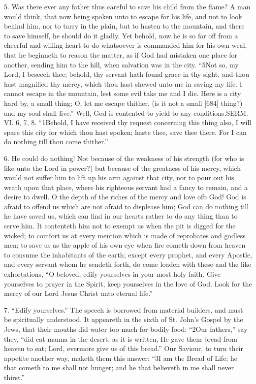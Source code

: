 5. Was there ever any father thus careful to save his child from the flame? A man would think, that now being spoken unto to escape for his life, and not to look behind him, nor to tarry in the plain, but to hasten to the mountain, and there to save himself, he should do it gladly. Yet behold, now he is so far off from a cheerful and willing heart to do whatsoever is commanded him for his own weal, that he beginneth to reason the matter, as if God had mistaken one place for another, sending him to the hill, when salvation was in the city. “5Not so, my Lord, I beseeeh thee; behold, thy servant hath found grace in thy sight, and thou hast magnified thy mercy, which thou hast shewed unto me in saving my life. I cannot escape in the mountain, lest some evil take me and I die. Here is a city hard by, a small thing; O, let me escape thither, (is it not a small [684] thing?) and my soul shall live.” Well, God is contented to yield to any conditions.SERM. VI. 6, 7, 8. “1Behold, I have received thy request concerning this thing also, I will spare this city for which thou hast spoken; haste thee, save thee there. For I can do nothing till thou come thither.”

6. He could do nothing! Not because of the weakness of his strength (for who is like unto the Lord in power?) but because of the greatness of his mercy, which would not suffer him to lift up his arm against that city, nor to pour out his wrath upon that place, where his righteous servant had a fancy to remain, and a desire to dwell. O the depth of the riches of the mercy and love ofb God! God is afraid to offend us which are not afraid to displease him; God can do nothing till he have saved us, which can find in our hearts rather to do any thing than to serve him. It contenteth him not to exempt us when the pit is digged for the wicked; to comfort us at every mention which is made of reprobates and godless men; to save us as the apple of his own eye when fire cometh down from heaven to consume the inhabitants of the earth; except every prophet, and every Apostle, and every servant whom he sendeth forth, do come loaden with these and the like exhortations, “O beloved, edify yourselves in your most holy faith. Give yourselves to prayer in the Spirit, keep yourselves in the love of God. Look for the mercy of our Lord Jesus Christ unto eternal life.”

7. “Edify yourselves.” The speech is borrowed from material builders, and must be spiritually understood. It appeareth in the sixth of St. John’s Gospel by the Jews, that their mouths did water too much for bodily food: “2Our fathers,” say they, “did eat manna in the desert, as it is written, He gave them bread from heaven to eat; Lord, evermore give us of this bread.” Our Saviour, to turn their appetite another way, maketh them this answer: “3I am the Bread of Life; he that cometh to me shall not hunger; and he that believeth in me shall never thirst.”

